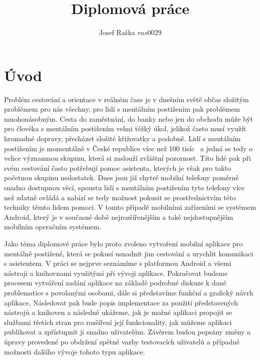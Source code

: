 \documentclass[czech,master,public,dept460,male,java,cpdeclaration]{diploma}
\title{Diplomová práce}
\author{Josef Raška \(ras0029\)}
\begin{document}
\MakeTitlePages
{}


\newpage

\section{Úvod}
Problém cestování a orientace v reálném čase je v dnešním světě občas složitým problémem pro nás všechny,
pro lidi s mentálním postižením pak problémem mnohonásobným. Cesta do zaměstnání, do banky
nebo jen do obchodu může být pro člověka s mentálním postižením velmi těžký úkol, jelikož často musí
využít hromadné dopravy, přecházet složité křižovatky a podobně. Lidí s mentálním postižením
je momentálně v České republice více než 100 tisíc~\cite{komunikace} a jedná se tedy o velice
významnou skupinu, která si zaslouží zvláštní pozornost. Tito lidé pak při svém cestování často potřebují
pomoc asistenta, kterých je však pro takto početnou skupinu nedostatek.
Dnes jsou již chytré mobilní telefony poměrně snadno dostupnou věcí, spoustu lidí
s mentálním postižením tyto telefony více než zdatně ovládá a nabízí se tedy možnost pokusit se prostřednictvím
 této techniky těmto lidem pomoci. V tomto případě mobilními zařízeními se systémem Android,
 který je v současné době nejrozšířenějším a také nejdostupnějším mobilním operačním systémem.

Jako téma diplomové práce bylo proto zvoleno vytvoření mobilní aplikace pro mentálně postižené,
 která se pokusí usnadnit jim cestování a urychlit komunikaci s asistentem. V práci se nejprve
 seznámíme s platformou Android a všemi nástroji a knihovnami využitými při vývoji aplikace.
 Pokračovat budeme procesem vytváření zadání aplikace na základě podrobné diskuze k dané problematice s povolanými osobami,
 dále si představíme funkční a grafický návrh aplikace.
 Následovat pak bude popis implementace za použití představených nástrojů a knihoven a následně ukážeme,
 jak je možné aplikaci propojit se službami třetích stran pro rozšíření její funkcionality, jak
 můžeme aplikaci publikovat a zpřístupnit ji snadno uživatelům. Závěrem budou popsány
 změny a úpravy provedené po obdržení zpětné vazby testovacích uživatelů a případné možnosti dalšího vývoje tohoto typu aplikace.
\end{document}

